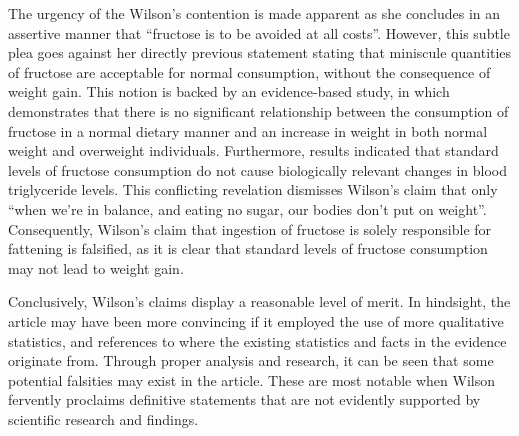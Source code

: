 \documentclass[12pt]{article}
\begin{document}
\bigskip
The urgency of the Wilson’s contention is made apparent as she concludes in an assertive manner that “fructose is to be avoided at all costs”. However, this subtle plea goes against her directly previous statement stating that miniscule quantities of fructose are acceptable for normal consumption, without the consequence of weight gain. This notion is backed by an evidence-based study, in which \textcite{dolan} demonstrates that there is no significant relationship between the consumption of fructose in a normal dietary manner and an increase in weight in both normal weight and overweight individuals. Furthermore, results indicated that standard levels of fructose consumption do not cause biologically relevant changes in blood triglyceride levels. This conflicting revelation dismisses Wilson’s claim that only “when we’re in balance, and eating no sugar, our bodies don’t put on weight”. Consequently, Wilson’s claim that ingestion of fructose is solely responsible for fattening is falsified, as it is clear that standard levels of fructose consumption may not lead to weight gain.

\bigskip
Conclusively, Wilson’s claims display a reasonable level of merit. In hindsight, the article may have been more convincing if it employed the use of more qualitative statistics, and references to where the existing statistics and facts in the evidence originate from. Through proper analysis and research, it can be seen that some potential falsities may exist in the article. These are most notable when Wilson fervently proclaims definitive statements that are not evidently supported by scientific research and findings.


\pagebreak
\printbibliography
\end{document}
